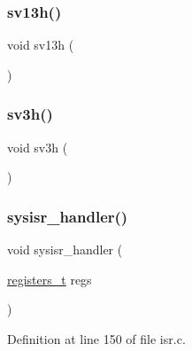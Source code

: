 \subsubsection{\texorpdfstring{sv13h()}{sv13h()}}
{\footnotesize\ttfamily void sv13h (\begin{DoxyParamCaption}{ }\end{DoxyParamCaption})}

\mbox{\label{a00113_ad118f86f4af40a3b4b94bc7c4977e762_ad118f86f4af40a3b4b94bc7c4977e762}} 
\subsubsection{\texorpdfstring{sv3h()}{sv3h()}}
{\footnotesize\ttfamily void sv3h (\begin{DoxyParamCaption}{ }\end{DoxyParamCaption})}

\mbox{\label{a00113_abd1fa375737cd5ecd84c082738e3b195_abd1fa375737cd5ecd84c082738e3b195}} 
\subsubsection{\texorpdfstring{sysisr\+\_\+handler()}{sysisr\_handler()}}
{\footnotesize\ttfamily void sysisr\+\_\+handler (\begin{DoxyParamCaption}\item[{\hyperlink{a00140_adf58dbaf6139b4957c348711f2026957_adf58dbaf6139b4957c348711f2026957}{registers\+\_\+t}}]{regs }\end{DoxyParamCaption})}



Definition at line 150 of file isr.\+c.


